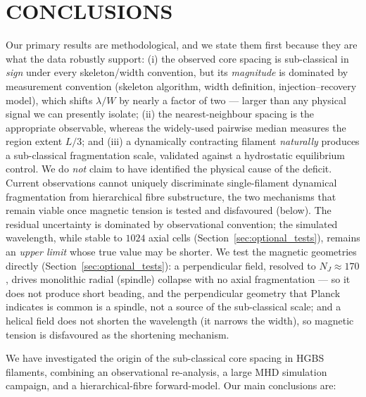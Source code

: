 \documentclass[usenatbib,twoside,twocolumn]{mnras}
\begin{document}
\section{CONCLUSIONS}

Our primary results are methodological, and we state them first because they are what the data robustly support: (i) the observed core spacing is sub-classical in \emph{sign} under every skeleton/width convention, but its \emph{magnitude} is dominated by measurement convention (skeleton algorithm, width definition, injection--recovery model), which shifts $\lambda/W$ by nearly a factor of two --- larger than any physical signal we can presently isolate; (ii) the nearest-neighbour spacing is the appropriate observable, whereas the widely-used pairwise median measures the region extent $L/3$; and (iii) a dynamically contracting filament \emph{naturally} produces a sub-classical fragmentation scale, validated against a hydrostatic equilibrium control. We do \emph{not} claim to have identified the physical cause of the deficit. Current observations cannot uniquely discriminate single-filament dynamical fragmentation from hierarchical fibre substructure, the two mechanisms that remain viable once magnetic tension is tested and disfavoured (below). The residual uncertainty is dominated by observational convention; the simulated wavelength, while stable to $1024$ axial cells (Section~\ref{sec:optional_tests}), remains an \emph{upper limit} whose true value may be shorter. We test the magnetic geometries directly (Section~\ref{sec:optional_tests}): a perpendicular field, resolved to $N_J\approx170$, drives monolithic radial (spindle) collapse with no axial fragmentation --- so it does not produce short beading, and the perpendicular geometry that Planck indicates is common is a spindle, not a source of the sub-classical scale; and a helical field does not shorten the wavelength (it narrows the width), so magnetic tension is disfavoured as the shortening mechanism.

We have investigated the origin of the sub-classical core spacing in HGBS filaments, combining an observational re-analysis, a large MHD simulation campaign, and a hierarchical-fibre forward-model. Our main conclusions are:
\end{document}
